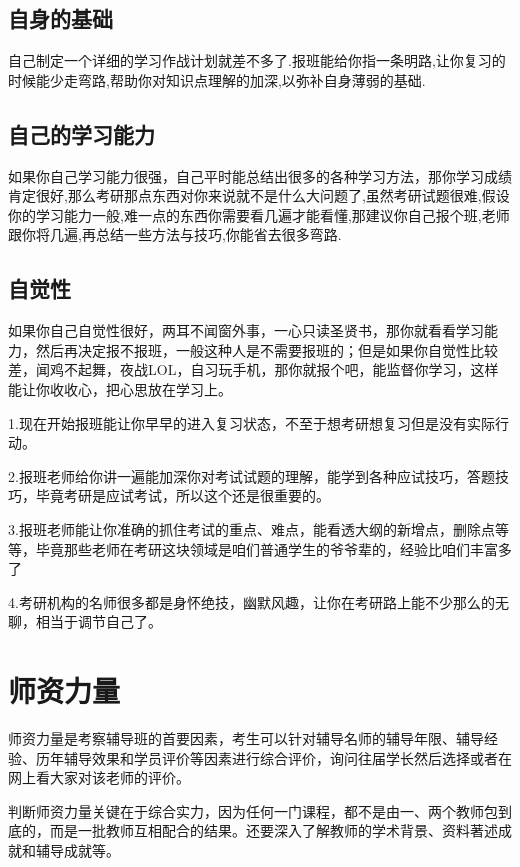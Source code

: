 \documentclass[a4paper]{ctexart}
\begin{document}
\noindent
\subsection{自身的基础}
自己制定一个详细的学习作战计划就差不多了.报班能给你指一条明路,让你复习的时候能少走弯路,帮助你对知识点理解的加深,以弥补自身薄弱的基础.

\subsection{自己的学习能力}

如果你自己学习能力很强，自己平时能总结出很多的各种学习方法，那你学习成绩肯定很好,那么考研那点东西对你来说就不是什么大问题了,虽然考研试题很难,假设你的学习能力一般,难一点的东西你需要看几遍才能看懂,那建议你自己报个班,老师跟你将几遍,再总结一些方法与技巧,你能省去很多弯路.

\subsection{自觉性}

如果你自己自觉性很好，两耳不闻窗外事，一心只读圣贤书，那你就看看学习能力，然后再决定报不报班，一般这种人是不需要报班的；但是如果你自觉性比较差，闻鸡不起舞，夜战LOL，自习玩手机，那你就报个吧，能监督你学习，这样能让你收收心，把心思放在学习上。


1.现在开始报班能让你早早的进入复习状态，不至于想考研想复习但是没有实际行动。

2.报班老师给你讲一遍能加深你对考试试题的理解，能学到各种应试技巧，答题技巧，毕竟考研是应试考试，所以这个还是很重要的。

3.报班老师能让你准确的抓住考试的重点、难点，能看透大纲的新增点，删除点等等，毕竟那些老师在考研这块领域是咱们普通学生的爷爷辈的，经验比咱们丰富多了

4.考研机构的名师很多都是身怀绝技，幽默风趣，让你在考研路上能不少那么的无聊，相当于调节自己了。

\section{师资力量}

师资力量是考察辅导班的首要因素，考生可以针对辅导名师的辅导年限、辅导经验、历年辅导效果和学员评价等因素进行综合评价，询问往届学长然后选择或者在网上看大家对该老师的评价。

判断师资力量关键在于综合实力，因为任何一门课程，都不是由一、两个教师包到底的，而是一批教师互相配合的结果。还要深入了解教师的学术背景、资料著述成就和辅导成就等。
\end{document}
